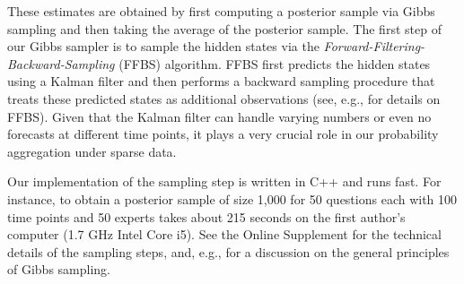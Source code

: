\documentclass[aoas, preprint]{imsart}
\numberwithin{equation}{section}
\theoremstyle{plain}
\begin{document}
These estimates are obtained by first computing a posterior sample via Gibbs sampling and then taking the average of the posterior sample. The first step of our Gibbs sampler is to sample the hidden states via the \textit{Forward-Filtering-Backward-Sampling} (FFBS) algorithm. FFBS first predicts the hidden states using a Kalman filter and then performs a backward sampling procedure that treats these predicted states as additional observations (see, e.g., \cite{carter1994gibbs, migon2005dynamic} for details on FFBS). Given that the Kalman filter can handle varying numbers or even no forecasts at different time points, it plays a very crucial role in our probability aggregation under sparse data. 
%
%

Our implementation of the sampling step is written in C++ and runs fast. For instance, to obtain a posterior sample of size 1,000 for 50 questions each with 100 time points and 50 experts takes about 215 seconds on the first author's computer (1.7 GHz Intel Core i5). See the Online Supplement for the technical details of the sampling steps, and, e.g., \citet{gelman2003bayesian} for a discussion on the general principles of Gibbs sampling. 
\end{document}
